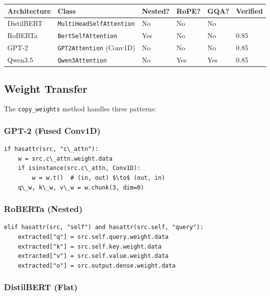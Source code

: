 \begin{table}[H]
\centering
\small
\begin{tabular}{llllll}
\toprule
\textbf{Architecture} & \textbf{Class} & \textbf{Nested?} & \textbf{RoPE?} & \textbf{GQA?} & \textbf{Verified} \\
\midrule
DistilBERT & \texttt{MultiHeadSelfAttention} & No & No & No &  \\
RoBERTa & \texttt{BertSelfAttention} & Yes & No & No & 0.85 \\
GPT-2 & \texttt{GPT2Attention} (Conv1D) & No & No & No & 0.85 \\
Qwen3.5 & \texttt{Qwen3Attention} & No & Yes & Yes & 0.85 \\
\bottomrule
\end{tabular}
\end{table}

\subsection{Weight Transfer}

The \texttt{copy\_weights} method handles three patterns:

\subsubsection{GPT-2 (Fused Conv1D)}

\begin{lstlisting}
if hasattr(src, "c\_attn"):
    w = src.c\_attn.weight.data
    if isinstance(src.c\_attn, Conv1D):
        w = w.t()  # (in, out) $\to$ (out, in)
    q\_w, k\_w, v\_w = w.chunk(3, dim=0)
\end{lstlisting}

\subsubsection{RoBERTa (Nested)}

\begin{lstlisting}
elif hasattr(src, "self") and hasattr(src.self, "query"):
    extracted["q"] = src.self.query.weight.data
    extracted["k"] = src.self.key.weight.data
    extracted["v"] = src.self.value.weight.data
    extracted["o"] = src.output.dense.weight.data
\end{lstlisting}

\subsubsection{DistilBERT (Flat)}

